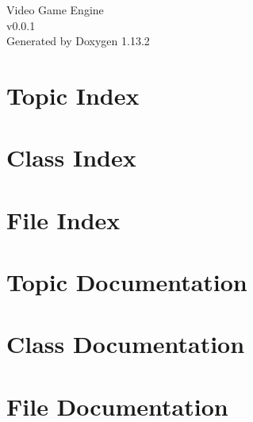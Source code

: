 \documentclass[twoside]{book}
\newcommand{\+}{\discretionary{\mbox{\scriptsize$\hookleftarrow$}}{}{}}
\newcommand{\clearemptydoublepage}{%
    \newpage{\pagestyle{empty}\cleardoublepage}%
  }
\begin{document}
  \raggedbottom
    \hypersetup{pageanchor=false,
                bookmarksnumbered=true,
                pdfencoding=unicode
               }
  \begin{titlepage}
  \vspace*{7cm}
  \begin{center}%
  {\Large Video Game Engine}\\
  [1ex]\large v0.\+0.\+1 \\
  \vspace*{1cm}
  {\large Generated by Doxygen 1.13.2}\\
  \end{center}
  \end{titlepage}
  \clearemptydoublepage
  \tableofcontents
  \clearemptydoublepage
  \hypersetup{pageanchor=true}
\chapter{Topic Index}

\chapter{Class Index}

\chapter{File Index}

\chapter{Topic Documentation}





\chapter{Class Documentation}







\chapter{File Documentation}
















  \backmatter
  \newpage
  \clearemptydoublepage
  \printindex
\end{document}

